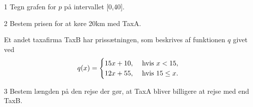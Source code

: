 %
\begin{delopgave}{}{1}
	Tegn grafen for $p$ på intervallet [0,40].
\end{delopgave}
%
\begin{delopgave}{}{2}
	Bestem prisen for at køre 20km med TaxA.
\end{delopgave}
%
\begin{meretekst}
	Et andet taxafirma TaxB har prissætningen, som beskrives af funktionen $q$ givet ved
	\begin{align*}
		q(x) = \begin{cases}
			15x + 10, &\textnormal{ hvis } x < 15, \\
			12x + 55, &\textnormal{ hvis } 15 \leq x.
		\end{cases}
	\end{align*}
\end{meretekst}
%
\begin{delopgave}{}{3}
	Bestem længden på den rejse der gør, at TaxA bliver billigere at rejse med end TaxB.
\end{delopgave}
